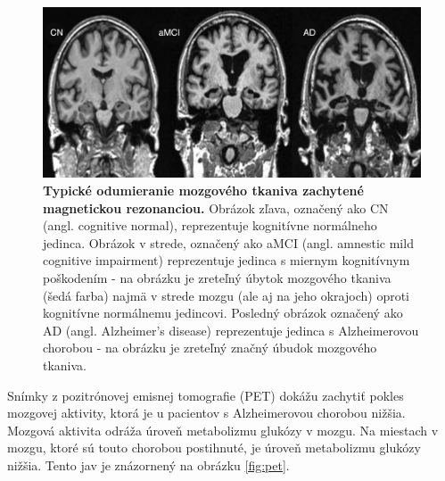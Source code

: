\begin{figure}[h!]
    \centering
    \includegraphics[scale=0.3]{assets/images/mri_brain_antrophy.png}
    \caption{\textbf{Typické odumieranie mozgového tkaniva zachytené magnetickou rezonanciou.} Obrázok zľava, označený ako CN (angl. cognitive normal), reprezentuje kognitívne normálneho jedinca. Obrázok v strede, označený ako aMCI (angl. amnestic mild cognitive impairment) reprezentuje jedinca s miernym kognitívnym poškodením - na obrázku je zreteľný úbytok mozgového tkaniva (šedá farba) najmä v strede mozgu (ale aj na jeho okrajoch) oproti kognitívne normálnemu jedincovi. Posledný obrázok označený ako AD (angl. Alzheimer’s disease) reprezentuje jedinca s Alzheimerovou chorobou - na obrázku je zreteľný značný úbudok mozgového tkaniva. \cite{khan2016biomarkers}
    } 
    \label{fig:mri_brain_antrophy}
\end{figure}

Snímky z pozitrónovej emisnej tomografie (PET) dokážu zachytiť pokles mozgovej aktivity, ktorá je u pacientov s Alzheimerovou chorobou nižšia. Mozgová aktivita odráža úroveň metabolizmu glukózy v mozgu. Na miestach v mozgu, ktoré sú touto chorobou postihnuté, je úroveň metabolizmu glukózy nižšia. Tento jav je znázornený na obrázku \ref{fig:pet}.

